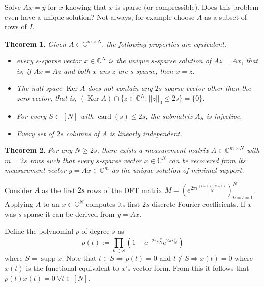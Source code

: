 \documentclass[10pt,a4paper]{article}
\theoremstyle{thmstyle}
\newtheorem{theorem}{Theorem}
\DeclareMathOperator{\supp}{supp}
\DeclareMathOperator{\Ker}{Ker}
\DeclareMathOperator{\card}{card}
\begin{document}
Solve $Ax = y$ for $x$ knowing that $x$ is sparse (or compressible).
Does this problem even have a unique solution?
Not always, for example choose $A$ as a subset of rows of $I$.

\begin{theorem}
  Given $A \in \mathbb{C}^{m \times N}$, the following properties are equivalent.
  \begin{itemize}
  \item every $s$-sparse vector $x \in \mathbb{C}^{N}$ is the unique $s$-sparse solution of $Az = Ax$, that is, if $Ax = Az$ and both $x$ ans $z$ are $s$-sparse, then $x = z$.
  \item The null space $\Ker A$ does not contain any $2s$-sparse vector other than the zero vector, that is, $(\Ker A) \cap \{ z \in \mathbb{C}^{N} : ||z||_{0} \le 2s \} = \{ 0 \}$.
  \item For every $S \subset [N]$ with $\card(s) \le 2s$, the submatrix $A_{S}$ is injective.
  \item Every set of $2s$ columns of $A$ is linearly independent.
  \end{itemize}
\end{theorem}

\begin{theorem}
  For any $N \ge 2s$, there exists a measurement matrix $A \in \mathbb{C}^{m \times N}$ with $m = 2s$ rows such that every $s$-sparse vector $x \in \mathbb{C}^{N}$ can be recovered from its measurement vector $y = Ax \in \mathbb{C}^{m}$ as the unique solution of minimal support.
\end{theorem}

Consider $A$ as the first $2s$ rows of the DFT matrix $M = (e^{2\pi i \frac{(l - 1)(k - 1)}{N}})_{k=l=1}^{N}$.
Applying $A$ to an $x \in \mathbb{C}^{N}$ computes its first $2s$ discrete Fourier coefficients.
If $x$ was $s$-sparse it can be derived from $y = Ax$.

Define the polynomial $p$ of degree $s$ as
\begin{equation*}
  p(t) := \prod_{k \in S} (1 - e^{-2\pi i \frac{k}{N}} e^{2\pi i \frac{t}{N}})
\end{equation*}
where $S = \supp x$.
Note that $t \in S \Rightarrow p(t) = 0$ and $t \not\in S \Rightarrow x(t) = 0$ where $x(t)$ is the functional equivalent to $x$'s vector form.
From this it follows that $p(t)x(t) = 0~\forall t \in [N]$.
\end{document}
